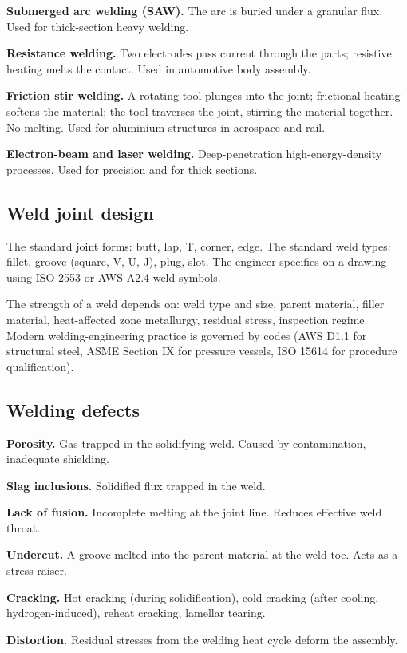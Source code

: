 \textbf{Submerged arc welding (SAW).} The arc is buried under a granular flux. Used for thick-section heavy welding.

\textbf{Resistance welding.} Two electrodes pass current through the parts; resistive heating melts the contact. Used in automotive body assembly.

\textbf{Friction stir welding.} A rotating tool plunges into the joint; frictional heating softens the material; the tool traverses the joint, stirring the material together. No melting. Used for aluminium structures in aerospace and rail.

\textbf{Electron-beam and laser welding.} Deep-penetration high-energy-density processes. Used for precision and for thick sections.

\subsection{Weld joint design}

The standard joint forms: butt, lap, T, corner, edge. The standard weld types: fillet, groove (square, V, U, J), plug, slot. The engineer specifies on a drawing using ISO 2553 or AWS A2.4 weld symbols.

The strength of a weld depends on: weld type and size, parent material, filler material, heat-affected zone metallurgy, residual stress, inspection regime. Modern welding-engineering practice is governed by codes (AWS D1.1 for structural steel, ASME Section IX for pressure vessels, ISO 15614 for procedure qualification).

\subsection{Welding defects}

\textbf{Porosity.} Gas trapped in the solidifying weld. Caused by contamination, inadequate shielding.

\textbf{Slag inclusions.} Solidified flux trapped in the weld.

\textbf{Lack of fusion.} Incomplete melting at the joint line. Reduces effective weld throat.

\textbf{Undercut.} A groove melted into the parent material at the weld toe. Acts as a stress raiser.

\textbf{Cracking.} Hot cracking (during solidification), cold cracking (after cooling, hydrogen-induced), reheat cracking, lamellar tearing.

\textbf{Distortion.} Residual stresses from the welding heat cycle deform the assembly.

